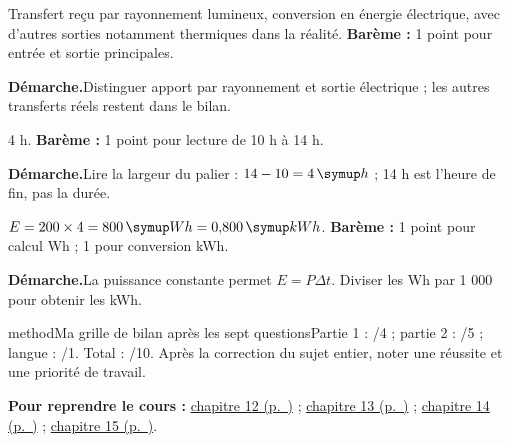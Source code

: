 \label{cor-bb-8}
\par\noindent\begin{minipage}{\linewidth}
Transfert reçu par rayonnement lumineux, conversion en énergie électrique, avec d’autres sorties notamment thermiques dans la réalité. \textbf{Barème :} 1 point pour entrée et sortie principales.\par
\smallskip\noindent\textbf{Démarche.}\enspace Distinguer apport par rayonnement et sortie électrique ; les autres transferts réels restent dans le bilan.\par
\end{minipage}\par
\par\noindent\begin{minipage}{\linewidth}
4 h. \textbf{Barème :} 1 point pour lecture de 10 h à 14 h.\par
\smallskip\noindent\textbf{Démarche.}\enspace Lire la largeur du palier : $14-10=4\unite h$ ; 14 h est l’heure de fin, pas la durée.\par
\end{minipage}\par
\par\noindent\begin{minipage}{\linewidth}
$E=200\times4=800\unite{Wh}=0{,}800\unite{kWh}$. \textbf{Barème :} 1 point pour calcul Wh ; 1 pour conversion kWh.\par
\smallskip\noindent\textbf{Démarche.}\enspace La puissance constante permet $E=P\Delta t$. Diviser les Wh par 1 000 pour obtenir les kWh.\par
{}
\end{minipage}\par
\par\noindent\begin{minipage}{\linewidth}
\begin{pcEncadre}{method}{Ma grille de bilan après les sept questions}Partie 1 : /4 ; partie 2 : /5 ; langue : /1. Total : /10. Après la correction du sujet entier, noter une réussite et une priorité de travail.\end{pcEncadre}
{\small\textbf{Pour reprendre le cours : }\hyperref[chap-12]{chapitre 12 (p.~\pageref*{chap-12})} ; \hyperref[chap-13]{chapitre 13 (p.~\pageref*{chap-13})} ; \hyperref[chap-14]{chapitre 14 (p.~\pageref*{chap-14})} ; \hyperref[chap-15]{chapitre 15 (p.~\pageref*{chap-15})}.\par}\end{minipage}\par
